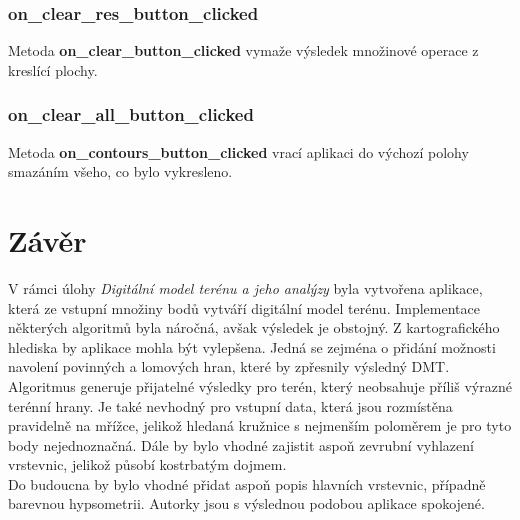 \documentclass[a4paper, 12pt]{article}
\begin{document}
\subsubsection*{on\_clear\_res\_button\_clicked}
Metoda \textbf{on\_clear\_button\_clicked} vymaže výsledek množinové operace z kreslící plochy. 

\subsubsection*{on\_clear\_all\_button\_clicked}
Metoda \textbf{on\_contours\_button\_clicked} vrací aplikaci do výchozí polohy smazáním všeho, co bylo vykresleno. 



\clearpage
\section{Závěr}
V rámci úlohy \textit{Digitální model terénu a jeho analýzy} byla vytvořena aplikace, která ze vstupní množiny bodů vytváří digitální model terénu. Implementace některých algoritmů byla náročná, avšak výsledek je obstojný. Z kartografického hlediska by aplikace mohla být  vylepšena. Jedná se zejména o přidání možnosti navolení povinných a lomových hran, které by zpřesnily výsledný DMT. Algoritmus generuje přijatelné výsledky pro terén, který neobsahuje příliš výrazné terénní hrany. Je také nevhodný pro vstupní data, která jsou rozmístěna pravidelně na mřížce, jelikož hledaná kružnice s nejmenším poloměrem je pro tyto body nejednoznačná. Dále by bylo vhodné zajistit aspoň zevrubní vyhlazení vrstevnic, jelikož působí kostrbatým dojmem. \\

Do budoucna by bylo vhodné přidat aspoň popis hlavních vrstevnic, případně barevnou hypsometrii. Autorky jsou s výslednou podobou aplikace spokojené. 
\clearpage
\end{document}
